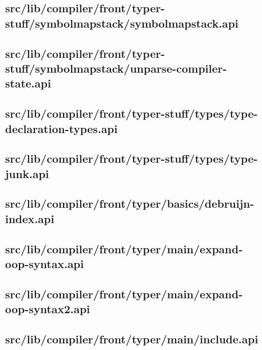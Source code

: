 \subsection{src/lib/compiler/front/typer-stuff/symbolmapstack/symbolmapstack.api}


\subsection{src/lib/compiler/front/typer-stuff/symbolmapstack/unparse-compiler-state.api}


\subsection{src/lib/compiler/front/typer-stuff/types/type-declaration-types.api}


\subsection{src/lib/compiler/front/typer-stuff/types/type-junk.api}


\subsection{src/lib/compiler/front/typer/basics/debruijn-index.api}


\subsection{src/lib/compiler/front/typer/main/expand-oop-syntax.api}


\subsection{src/lib/compiler/front/typer/main/expand-oop-syntax2.api}


\subsection{src/lib/compiler/front/typer/main/include.api}


